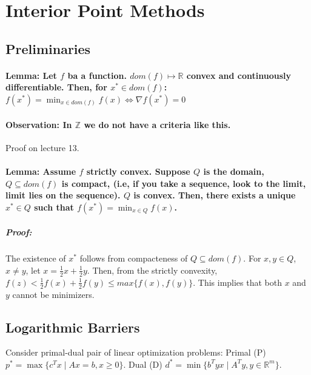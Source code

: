 \documentclass[main]{subfiles}
\begin{document}

\section{Interior Point Methods}

\subsection{Preliminaries}

\paragraph{Lemma: Let $f$ ba a function. $dom(f) \mapsto \mathbb{R}$ convex
and continuously differentiable. Then, for $x^* \in dom(f)$:
$f(x^*) = \displaystyle \min_{x \in dom(f)} f(x) \iff \nabla f(x^*) = 0$}

\paragraph{Observation: In $\mathbb{Z}$ we do not have a criteria like this.}
Proof on lecture 13.

\paragraph{Lemma: Assume $f$ strictly convex. Suppose $Q$ is the domain,
$Q \subseteq dom(f)$ is compact, (i.e, if you take a sequence, look to the
limit, limit lies on the sequence). $Q$ is convex. Then, there exists a unique
$x^* \in Q$ such that $f(x^*) = \displaystyle \min_{x \in Q} f(x)$.}

\subparagraph{Proof:}
The existence of $x^*$ follows from compacteness of $Q \subseteq dom (f)$. For
$x, y \in Q$, $x \neq y$, let $x = \frac{1}{2}x + \frac{1}{2}y$. Then, from the
strictly convexity, $f(z) < \frac{1}{2} f(x) + \frac{1}{2} f(y) \leq max \{f(x),
f(y) \}$. This implies that both $x$ and $y$ cannot be minimizers.

\subsection{Logarithmic Barriers}
Consider primal-dual pair of linear optimization problems:
Primal (P) $p^* = \max \{c^T x \mid Ax = b, x \geq 0 \}$.
Dual (D) $d^* = \min \{b^T y x \mid A^T y, y \in \mathbb{R}^m \}$.
\end{document}
